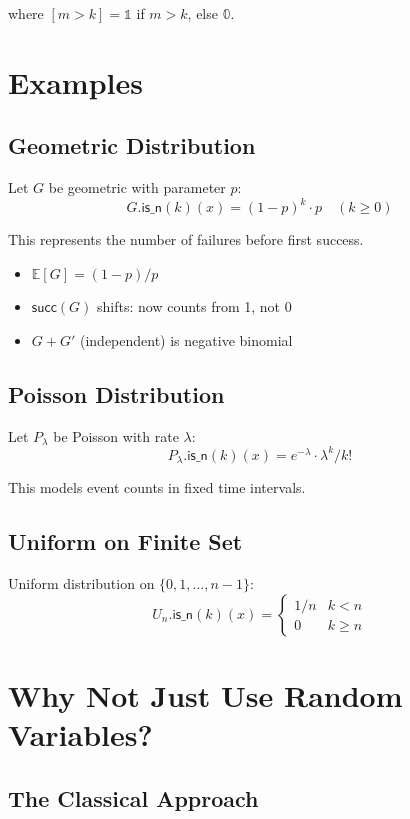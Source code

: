 \documentclass[11pt,a4paper]{article}
\newcommand{\E}{\mathbb{E}}
\newcommand{\pzero}{\mathbb{0}}
\newcommand{\pone}{\mathbb{1}}
\begin{document}
where $[m > k] = \pone$ if $m > k$, else $\pzero$.

\section{Examples}

\subsection{Geometric Distribution}

Let $G$ be geometric with parameter $p$:
\[
G.\mathsf{is\_n}(k)(x) = (1-p)^k \cdot p \quad (k \geq 0)
\]

This represents the number of failures before first success.

\begin{itemize}
    \item $\E[G] = (1-p)/p$
    \item $\mathsf{succ}(G)$ shifts: now counts from 1, not 0
    \item $G + G'$ (independent) is negative binomial
\end{itemize}

\subsection{Poisson Distribution}

Let $P_\lambda$ be Poisson with rate $\lambda$:
\[
P_\lambda.\mathsf{is\_n}(k)(x) = e^{-\lambda} \cdot \lambda^k / k!
\]

This models event counts in fixed time intervals.

\subsection{Uniform on Finite Set}

Uniform distribution on $\{0, 1, \ldots, n-1\}$:
\[
U_n.\mathsf{is\_n}(k)(x) = \begin{cases} 1/n & k < n \\ 0 & k \geq n \end{cases}
\]

\section{Why Not Just Use Random Variables?}

\subsection{The Classical Approach}
\end{document}
